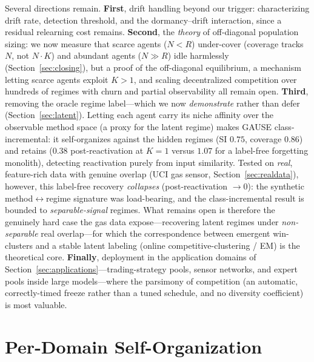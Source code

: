\documentclass[10pt]{article}
\begin{document}
Several directions remain. \textbf{First}, drift handling beyond our trigger:
characterizing drift rate, detection threshold, and the dormancy--drift interaction,
since a residual relearning cost remains. \textbf{Second}, the \emph{theory} of
off-diagonal population sizing: we now measure that scarce agents ($N<R$) under-cover
(coverage tracks $N$, not $N\!\cdot\!K$) and abundant agents ($N\gg R$) idle harmlessly
(Section~\ref{sec:closing}), but a proof of the off-diagonal equilibrium, a mechanism
letting scarce agents exploit $K>1$, and scaling decentralized competition over hundreds
of regimes with churn and partial observability all remain open.
\textbf{Third}, removing the oracle regime label---which we now \emph{demonstrate}
rather than defer (Section~\ref{sec:latent}). Letting each agent carry its niche
affinity over the observable method space (a proxy for the latent regime) makes
GAUSE class-incremental: it self-organizes against the hidden regimes (SI $0.75$,
coverage $0.86$) and retains ($0.38$ post-reactivation at $K{=}1$ versus $1.07$ for
a label-free forgetting monolith), detecting reactivation purely from input
similarity. Tested on \emph{real}, feature-rich data with genuine overlap (UCI gas
sensor, Section~\ref{sec:realdata}), however, this label-free recovery
\emph{collapses} (post-reactivation $\to 0$): the synthetic
method$\leftrightarrow$regime signature was load-bearing, and the class-incremental
result is bounded to \emph{separable-signal} regimes. What remains open is therefore
the genuinely hard case the gas data expose---recovering latent regimes under
\emph{non-separable} real overlap---for which the correspondence between emergent
win-clusters and a stable latent labeling (online competitive-clustering / EM) is the
theoretical core.
\textbf{Finally}, deployment in the application domains of
Section~\ref{sec:applications}---trading-strategy pools, sensor networks, and expert
pools inside large models---where the parsimony of competition (an automatic,
correctly-timed freeze rather than a tuned schedule, and no diversity coefficient) is
most valuable.

\appendix

\section{Per-Domain Self-Organization}
\label{app:perdomain}
\end{document}

